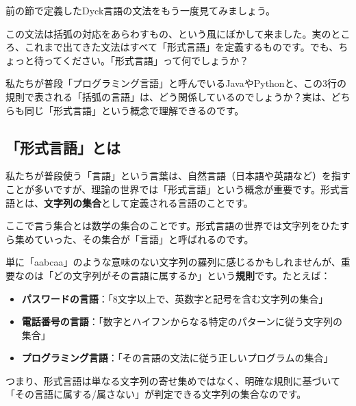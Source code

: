 前の節で定義したDyck言語の文法をもう一度見てみましょう。

\begin{Shaded}
\begin{Highlighting}[]
\end{Highlighting}
\end{Shaded}

この文法は括弧の対応をあらわすもの、という風にぼかして来ました。実のところ、これまで出てきた文法はすべて「形式言語」を定義するものです。でも、ちょっと待ってください。「形式言語」って何でしょうか？

私たちが普段「プログラミング言語」と呼んでいるJavaやPythonと、この3行の規則で表される「括弧の言語」は、どう関係しているのでしょうか？実は、どちらも同じ「形式言語」という概念で理解できるのです。

\hypertarget{chapter4-ux5f62ux5f0fux8a00ux8a9eux3068ux306f}{%
\subsection{「形式言語」とは}\label{chapter4-ux5f62ux5f0fux8a00ux8a9eux3068ux306f}}

私たちが普段使う「言語」という言葉は、自然言語（日本語や英語など）を指すことが多いですが、理論の世界では「形式言語」という概念が重要です。形式言語とは、\textbf{文字列の集合}として定義される言語のことです。

ここで言う集合とは数学の集合のことです。形式言語の世界では文字列をひたすら集めていった、その集合が「言語」と呼ばれるのです。

単に「aabcaa」のような意味のない文字列の羅列に感じるかもしれませんが、重要なのは「どの文字列がその言語に属するか」という\textbf{規則}です。たとえば：

\begin{itemize}
\tightlist
\item
  \textbf{パスワードの言語}：「8文字以上で、英数字と記号を含む文字列の集合」
\item
  \textbf{電話番号の言語}：「数字とハイフンからなる特定のパターンに従う文字列の集合」
\item
  \textbf{プログラミング言語}：「その言語の文法に従う正しいプログラムの集合」
\end{itemize}

つまり、形式言語は単なる文字列の寄せ集めではなく、明確な規則に基づいて「その言語に属する/属さない」が判定できる文字列の集合なのです。

